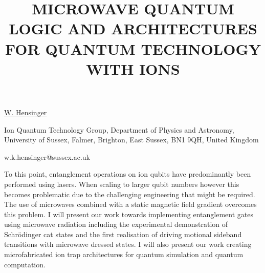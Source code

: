 \title{MICROWAVE QUANTUM LOGIC AND ARCHITECTURES FOR QUANTUM TECHNOLOGY WITH IONS}

\underline{W. Hensinger} 

{\normalsize{\vspace{-4mm}
Ion Quantum Technology Group, Department of Physics and Astronomy,
University of Sussex, Falmer, Brighton, East Sussex, BN1 9QH, United Kingdom

\email w.k.hensinger@sussex.ac.uk}}

To this point, entanglement operations on ion qubits have predominantly been performed using lasers.
When scaling to larger qubit numbers however this becomes problematic due to the challenging
engineering that might be required. The use of microwaves combined with a static magnetic field
gradient overcomes this problem. I will present our work towards implementing entanglement gates using
microwave radiation including the experimental demonstration of Schr\"{o}dinger cat states and the first
realisation of driving motional sideband transitions with microwave dressed states. I will also
present our work creating microfabricated ion trap architectures for quantum simulation and quantum
computation.

\vspace{\baselineskip}
